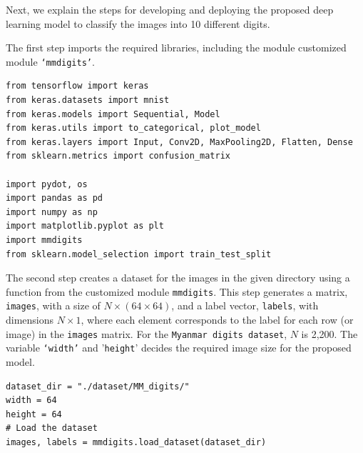 Next, we explain the steps for developing and deploying the proposed deep learning model to classify the images into 10 different digits.
\setcounter{stepcounter}{0}
\begin{step}
The first step imports the required libraries, including the module customized module \texttt{`mmdigits'}. 
\begin{lstlisting}
from tensorflow import keras
from keras.datasets import mnist
from keras.models import Sequential, Model
from keras.utils import to_categorical, plot_model
from keras.layers import Input, Conv2D, MaxPooling2D, Flatten, Dense
from sklearn.metrics import confusion_matrix

import pydot, os
import pandas as pd
import numpy as np
import matplotlib.pyplot as plt
import mmdigits
from sklearn.model_selection import train_test_split
\end{lstlisting}  
\end{step}

\begin{step}
The second step creates a dataset for the images in the given directory using a function from the customized module \texttt{mmdigits}. This step generates a matrix, \texttt{images}, with a size of $N \times (64 \times 64)$, and a label vector, \texttt{labels}, with dimensions $N \times 1$, where each element corresponds to the label for each row (or image) in the \texttt{images} matrix. For the \texttt{Myanmar digits dataset}, $N$ is 2,200. The variable \texttt{`width'} and '\texttt{height}' decides the required image size for the proposed model. 

\begin{lstlisting}
dataset_dir = "./dataset/MM_digits/"
width = 64
height = 64
# Load the dataset
images, labels = mmdigits.load_dataset(dataset_dir)
\end{lstlisting}  
\end{step}

